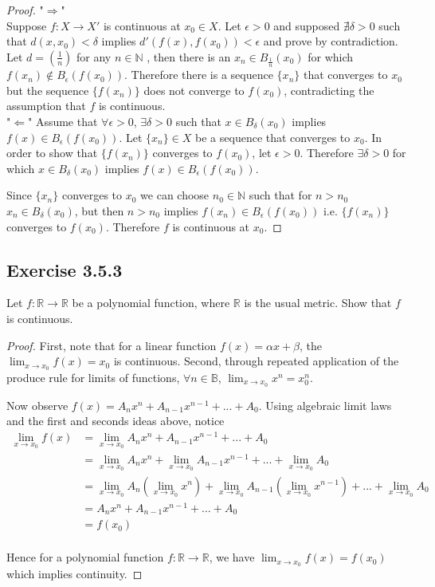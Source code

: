 \documentclass{tufte-book}
\theoremstyle{mytheoremstyle}
\theoremstyle{mylemstyle}
\theoremstyle{mydefstyle}
\begin{document}
\begin{proof}"$\Rightarrow$"\\
Suppose $f: X \rightarrow X'$ is continuous at $x_0 \in X$.  Let $\epsilon > 0$ and supposed $\nexists \delta>0$ such that $d(x, x_0) < \delta$ implies $d'(f(x), f(x_0)) < \epsilon$ and prove by contradiction.\\
Let $d = (\frac{1}{n})$ for any $n \in \mathbb{N}$ , then there is an $x_n \in B_\frac{1}{n}(x_0)$ for which $f(x_n) \not\in B_\epsilon(f(x_0))$.  Therefore there is a sequence $\{x_n\}$ that converges to $x_0$  but the sequence $\{f(x_n)\}$ does not converge to $f(x_0)$, contradicting the assumption that $f$ is continuous. \\
"$\Leftarrow$"
Assume that $\forall \epsilon > 0$, $\exists \delta >0$ such that $x \in B_\delta(x_0)$ implies $f(x) \in B_\epsilon(f(x_0))$.  Let $\{x_n\} \in X$ be a sequence that converges to $x_0$.  In order to show that $\{f(x_n)\}$ converges to $f(x_0)$, let $\epsilon >0$.  Therefore $\exists \delta >0$ for which $x \in B_\delta(x_0)$ implies $f(x) \in B_\epsilon(f(x_0))$.

Since $\{x_n\}$ converges to $x_0$ we can choose $n_0 \in \mathbb{N}$ such that for $n > n_0$ $x_n \in B_\delta(x_0)$, but then $n > n_0$ implies $f(x_n) \in B_\epsilon(f(x_0))$ i.e. $\{f(x_n)\}$ converges to $f(x_0)$.  Therefore $f$ is continuous at $x_0$.
\end{proof}

\subsection{Exercise 3.5.3}
Let $f: \mathbb{R} \rightarrow \mathbb{R}$ be a polynomial function, where $\mathbb{R}$ is the usual metric.  Show that $f$ is continuous.

\begin{proof}
First, note that for a linear function $f(x) = \alpha x + \beta$, the $\lim_{x \to x_0} f(x) = x_0$ is continuous.  Second, through repeated application of the produce rule for limits of functions, $\forall n \in \mathbb{B}$, $\lim_{x \to x_0} x^n = x_0^n$.

Now observe $f(x) = A_nx^n + A_{n-1}x^{n-1}+...+A_0$.  Using algebraic limit laws and the first and seconds ideas above, notice
\begin{align*}
\lim_{x \to x_0} f(x) &= \lim_{x \to x_0}  A_nx^n + A_{n-1}x^{n-1}+...+A_0\\
&=  \lim_{x \to x_0} A_nx^n + \lim_{x \to x_0} A_{n-1}x^{n-1}+...+\lim_{x \to x_0} A_0\\
&= \lim_{x \to x_0} A_n (\lim_{x \to x_0}x^n) + \lim_{x \to x_0} A_{n-1} (\lim_{x \to x_0}x^{n-1})+...+\lim_{x \to x_0} A_0\\
&= A_nx^n + A_{n-1}x^{n-1}+...+A_0\\
&= f(x_0)\\
\end{align*}

Hence for a polynomial function $f: \mathbb{R} \rightarrow \mathbb{R}$, we have $\lim_{x \to x_0} f(x) = f(x_0)$ which implies continuity.
\end{proof}
\end{document}
